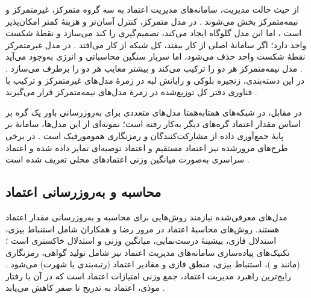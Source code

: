 \documentclass[12pt,a4paper]{article}
\begin{document}
از حیث حالت مدیریت، سامانه‌های مدیریت اعتماد به سه گروه متمرکز، غیرمتمرکز و نیمه‌متمرکز بخش می‌شوند \cite{razaBlockchainBasedReputationTrust2024}. در مدل متمرکز، کنترل آسان‌تر و هزینهٔ کمتر امکان‌پذیر است \cite{ghovanlooyghajarSBTMSScalableBlockchain2021}، اما این مدل گلوگاه ایجاد می‌کند، تصمیم‌گیری را کند می‌سازد و نقطهٔ شکست واحد دارد؛ اگر سامانهٔ اصلی از کار بیفتد، کل شبکه از کار می‌افتد \cite{ghovanlooyghajarSBTMSScalableBlockchain2021}. در مدل غیرمتمرکز نقطهٔ شکست واحد حذف می‌شود، اما سربار سنگین محاسباتی و انرژی به‌وجود می‌آید \cite{razaBlockchainBasedReputationTrust2024}. مدل نیمه‌متمرکز هر دو را ترکیب می‌کند و بیشتر معایب هر دو را برطرف می‌سازد \cite{razaBlockchainBasedReputationTrust2024}. در این دسته‌بندی، زنجیره بلوکی و رایانش لبه در زمرهٔ مدل‌های غیرمتمرکز و ترکیب با فناوری دفتر کل توزیع‌شده در زمرهٔ مدل‌های نیمه‌متمرکز قرار می‌گیرند \cite{razaBlockchainBasedReputationTrust2024}.

در مقابل، در شبکه‌های همتابه‌همتا مدل‌های متعددی برای به‌روزرسانی باور یک گره بر اساس مقدار اعتماد گره‌های دیگر به‌کار رفته است؛ نمونه‌ای از این مدل‌ها، سامانهٔ  بر پایهٔ جمع‌آوری داده از مشارکت‌کنندگان و رمزنگاری همومورفیک است \cite{ghovanlooyghajarSBTMSScalableBlockchain2021}. در برخی طرح‌های مرورشده نیز اعتماد مستقیم و اعتماد توصیه‌ای تمایز داده شده و اعتماد سراسری به‌صورت میانگین وزنی اعتماد‌های محلی تعریف شده است \cite{razaBlockchainBasedReputationTrust2024}.

\subsection{محاسبه و به‌روزرسانی اعتماد}

مدل‌های معرفی‌شده نیازمند روش‌هایی برای محاسبه و به‌روزرسانی مقدار اعتماد هستند. روش‌های محاسبهٔ اعتماد در مرور رضا و همکاران شامل استنباط بیزی، استدلال فازی، بیشینهٔ درست‌نمایی، میانگین وزنی و استدلال خاکستری است \cite{razaBlockchainBasedReputationTrust2024}؛ تکنیک‌های پیاده‌سازی سامانه‌های مدیریت اعتماد نیز شامل تولید گواهی، رمزنگاری (مانند  و )، استنباط بیزی، منطق فازی و مقادیر اعتماد (رتبه‌بندی یا شهرت) می‌شود \cite{razaBlockchainBasedReputationTrust2024}. رایج‌ترین راهبرد مدیریت اعتماد، جمع وزنی امتیازات اعتماد است که در آن با رفتار موذی، اعتماد به تدریج تا صفر کاهش می‌یابد \cite{farsimadanReviewSecurityChallenges2025}.
\end{document}
